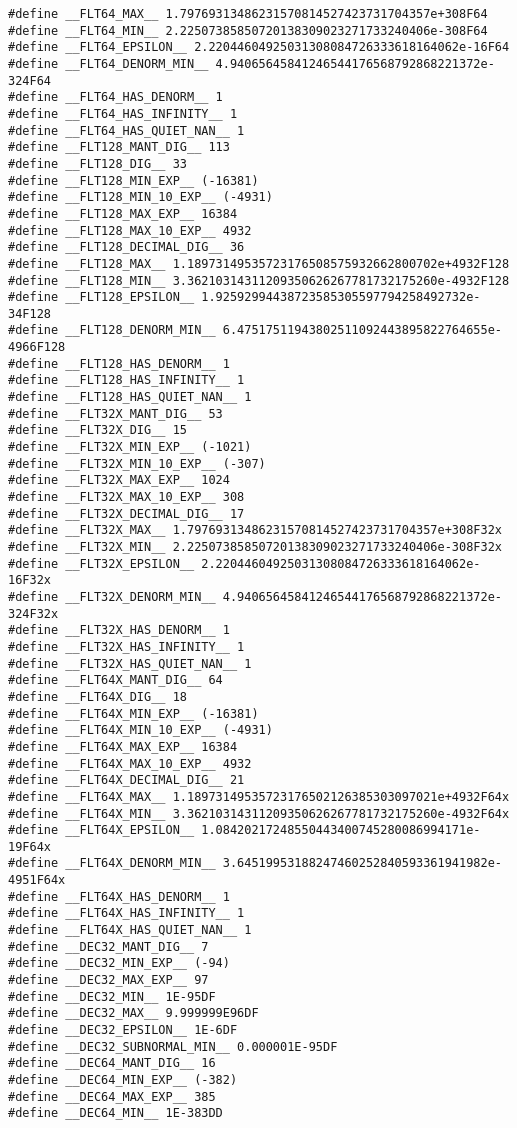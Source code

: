 \documentclass[11pt]{article}
\begin{document}
\begin{enumerate}
\begin{verbatim}
#define __FLT64_MAX__ 1.79769313486231570814527423731704357e+308F64
#define __FLT64_MIN__ 2.22507385850720138309023271733240406e-308F64
#define __FLT64_EPSILON__ 2.22044604925031308084726333618164062e-16F64
#define __FLT64_DENORM_MIN__ 4.94065645841246544176568792868221372e-324F64
#define __FLT64_HAS_DENORM__ 1
#define __FLT64_HAS_INFINITY__ 1
#define __FLT64_HAS_QUIET_NAN__ 1
#define __FLT128_MANT_DIG__ 113
#define __FLT128_DIG__ 33
#define __FLT128_MIN_EXP__ (-16381)
#define __FLT128_MIN_10_EXP__ (-4931)
#define __FLT128_MAX_EXP__ 16384
#define __FLT128_MAX_10_EXP__ 4932
#define __FLT128_DECIMAL_DIG__ 36
#define __FLT128_MAX__ 1.18973149535723176508575932662800702e+4932F128
#define __FLT128_MIN__ 3.36210314311209350626267781732175260e-4932F128
#define __FLT128_EPSILON__ 1.92592994438723585305597794258492732e-34F128
#define __FLT128_DENORM_MIN__ 6.47517511943802511092443895822764655e-4966F128
#define __FLT128_HAS_DENORM__ 1
#define __FLT128_HAS_INFINITY__ 1
#define __FLT128_HAS_QUIET_NAN__ 1
#define __FLT32X_MANT_DIG__ 53
#define __FLT32X_DIG__ 15
#define __FLT32X_MIN_EXP__ (-1021)
#define __FLT32X_MIN_10_EXP__ (-307)
#define __FLT32X_MAX_EXP__ 1024
#define __FLT32X_MAX_10_EXP__ 308
#define __FLT32X_DECIMAL_DIG__ 17
#define __FLT32X_MAX__ 1.79769313486231570814527423731704357e+308F32x
#define __FLT32X_MIN__ 2.22507385850720138309023271733240406e-308F32x
#define __FLT32X_EPSILON__ 2.22044604925031308084726333618164062e-16F32x
#define __FLT32X_DENORM_MIN__ 4.94065645841246544176568792868221372e-324F32x
#define __FLT32X_HAS_DENORM__ 1
#define __FLT32X_HAS_INFINITY__ 1
#define __FLT32X_HAS_QUIET_NAN__ 1
#define __FLT64X_MANT_DIG__ 64
#define __FLT64X_DIG__ 18
#define __FLT64X_MIN_EXP__ (-16381)
#define __FLT64X_MIN_10_EXP__ (-4931)
#define __FLT64X_MAX_EXP__ 16384
#define __FLT64X_MAX_10_EXP__ 4932
#define __FLT64X_DECIMAL_DIG__ 21
#define __FLT64X_MAX__ 1.18973149535723176502126385303097021e+4932F64x
#define __FLT64X_MIN__ 3.36210314311209350626267781732175260e-4932F64x
#define __FLT64X_EPSILON__ 1.08420217248550443400745280086994171e-19F64x
#define __FLT64X_DENORM_MIN__ 3.64519953188247460252840593361941982e-4951F64x
#define __FLT64X_HAS_DENORM__ 1
#define __FLT64X_HAS_INFINITY__ 1
#define __FLT64X_HAS_QUIET_NAN__ 1
#define __DEC32_MANT_DIG__ 7
#define __DEC32_MIN_EXP__ (-94)
#define __DEC32_MAX_EXP__ 97
#define __DEC32_MIN__ 1E-95DF
#define __DEC32_MAX__ 9.999999E96DF
#define __DEC32_EPSILON__ 1E-6DF
#define __DEC32_SUBNORMAL_MIN__ 0.000001E-95DF
#define __DEC64_MANT_DIG__ 16
#define __DEC64_MIN_EXP__ (-382)
#define __DEC64_MAX_EXP__ 385
#define __DEC64_MIN__ 1E-383DD

\end{verbatim}
\end{enumerate}
\end{document}
